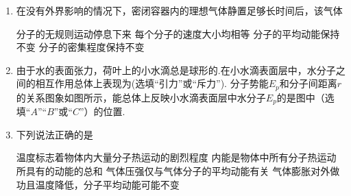 \begin{enumerate}[leftmargin=0em]
\item
{}
在没有外界影响的情况下，密闭容器内的理想气体静置足够长时间后，该气体  


\fourchoices
{分子的无规则运动停息下来}
{每个分子的速度大小均相等}
{分子的平均动能保持不变}
{分子的密集程度保持不变}


\item
{}
由于水的表面张力，荷叶上的小水滴总是球形的.在小水滴表面层中，水分子之间的相互作用总体上表现为(选填“引力”或“斥力”). 分子势能$ E_p $和分子间距离$ r $的关系图象如图所示，能总体上反映小水滴表面层中水分子$ E_p $的是图中（选填“$ A $”“$ B $”或“$ C $”）的位置.
\begin{figure}[h!]
\centering

\end{figure}



\item
{}
下列说法正确的是  


\fourchoices
{温度标志着物体内大量分子热运动的剧烈程度}
{内能是物体中所有分子热运动所具有的动能的总和}
{气体压强仅与气体分子的平均动能有关}
{气体膨胀对外做功且温度降低，分子平均动能可能不变}







\end{enumerate}


